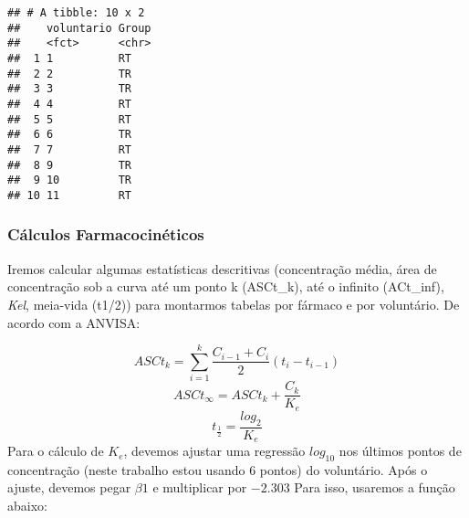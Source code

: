 \documentclass[
]{article}
\begin{document}
\begin{verbatim}
## # A tibble: 10 x 2
##    voluntario Group
##    <fct>      <chr>
##  1 1          RT   
##  2 2          TR   
##  3 3          TR   
##  4 4          RT   
##  5 5          RT   
##  6 6          TR   
##  7 7          RT   
##  8 9          TR   
##  9 10         TR   
## 10 11         RT
\end{verbatim}

\hypertarget{cuxe1lculos-farmacocinuxe9ticos}{%
\subsubsection{Cálculos
Farmacocinéticos}\label{cuxe1lculos-farmacocinuxe9ticos}}

Iremos calcular algumas estatísticas descritivas (concentração média,
área de concentração sob a curva até um ponto k (ASCt\_k), até o
infinito (ACt\_inf), \emph{Kel}, meia-vida (t1/2)) para montarmos
tabelas por fármaco e por voluntário. De acordo com a ANVISA:

\[ ASCt_{k}= \sum_{i=1}^{k} \frac{C_{i-1}+C_{i}}{2}(t_{i}-t_{i-1}) \]
\[ ASCt_{\infty}= ASCt_{k} + \frac{C_{k}}{K_{e}} \]
\[ t_{\frac{1}{2}} = \frac{log_{2}}{K_{e}}\] Para o cálculo de
\(K_{e}\), devemos ajustar uma regressão \(log_{10}\) nos últimos pontos
de concentração (neste trabalho estou usando 6 pontos) do voluntário.
Após o ajuste, devemos pegar \(\beta1\) e multiplicar por \(-2.303\)
Para isso, usaremos a função abaixo:
\end{document}
